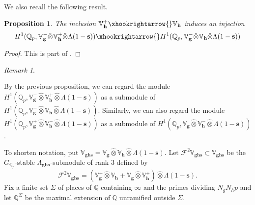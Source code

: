 \documentclass[a4paper,11pt]{amsart}
\theoremstyle{plain}
\newtheorem{propo}[theorem]{Proposition}
\theoremstyle{definition}
\theoremstyle{remark}
\newtheorem{remarkwr}[theorem]{Remark}
\newenvironment{remark}{\begin{remarkwr}\begin{upshape}}{\end{upshape}\end{remarkwr}}
\newcommand{\bb}{\mathbb}
\newcommand{\hg}{{\mathbf{g}}}
\newcommand{\hh}{{\mathbf h}}
\numberwithin{equation}{section}
\begin{document}
We also recall the following result.

\begin{propo}\label{prop:local-property}
    The inclusion $\bb{V}_{\hh}^+\xhookrightarrow{} \bb{V}_{\hh}$ induces an injection
    \[
    H^1(\bb{Q}_p,\bb{V}_{\hg}^-\hat{\otimes}\bb{V}_{\hh}^+\hat{\otimes}\Lambda(1-\mathbf{s}))\xhookrightarrow{}H^1(\bb{Q}_p,\bb{V}_{\hg}^-\hat{\otimes}\bb{V}_{\hh}\hat{\otimes}\Lambda(1-\mathbf{s}))
    \]
\end{propo}
\begin{proof}
    This is part of \cite[Prop.~8.1.7]{KLZ}.
\end{proof}

\begin{remark}
    By the previous proposition, we can regard the module $H^1(\bb{Q}_p,\bb{V}_{\hg}^-\hat{\otimes}\bb{V}_{\hh}^+\hat{\otimes}\Lambda(1-\mathbf{s}))$ as a submodule of $H^1(\bb{Q}_p,\bb{V}_{\hg}^-\hat{\otimes}\bb{V}_{\hh}\hat{\otimes}\Lambda(1-\mathbf{s}))$. Similarly, we can also regard the module $H^1(\bb{Q}_p,\bb{V}_{\hg}^+\hat{\otimes}\bb{V}_{\hh}^-\hat{\otimes}\Lambda(1-\mathbf{s}))$ as a submodule of $H^1(\bb{Q}_p,\bb{V}_{\hg}\hat{\otimes}\bb{V}_{\hh}^-\hat{\otimes}\Lambda(1-\mathbf{s}))$.
\end{remark}


To shorten notation, put $\bb{V}_{\hg\hh\mathbf{s}}=\bb{V}_{\hg}\hat{\otimes}\bb{V}_{\hh}\hat{\otimes}\Lambda(1-\mathbf{s})$. Let $\mathscr{F}^2\mathbb V_{\hg\hh\mathbf{s}}\subset \mathbb V_{\hg\hh\mathbf{s}}$ be the $G_{\bb{Q}_p}$-stable $\Lambda_{\hg \hh \mathbf{s}}$-submodule of rank $3$ defined by
\[
\mathscr{F}^2\mathbb V_{\hg\hh\mathbf{s}}=(\bb{V}_{\hg}^+\hat{\otimes}\bb{V}_{\hh} +\bb{V}_{\hg}\hat{\otimes}\bb{V}_{\hh}^+)\hat{\otimes}\Lambda(1-\mathbf{s}).
\]
Fix a finite set $\Sigma$ of places of $\mathbb Q$ containing $\infty$ and the primes dividing $N_gN_hp$ and let $\mathbb Q^\Sigma$ be the maximal extension of $\mathbb Q$ unramified outside $\Sigma$.
\end{document}
